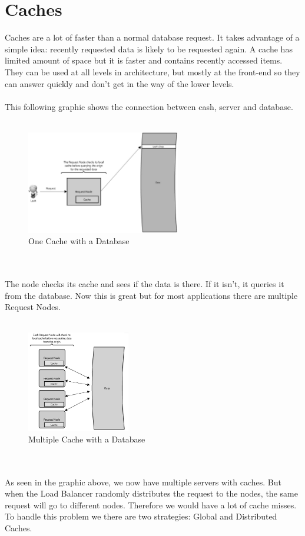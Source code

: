 \documentclass[12p]{article}
\begin{document}
	\newpage
	\section{Caches}
	
	Caches are a lot of faster than a normal database request. It takes advantage of a simple idea: recently requested data is likely to be requested again. A cache has limited amount of space but it is faster and contains recently accessed items. They can be used at all levels in architecture, but mostly at the front-end so they can answer quickly and don't get in the way of the lower levels. \\\\
	This following graphic shows the connection between cash, server and database. \\\\
	\begin{figure}[h!]
		\centering
		\includegraphics[width=0.6\textwidth]{img/cache1}
		\caption{One Cache with a Database \cite{cache}}
	\end{figure}
	\\\\
	The node checks its cache and sees if the data is there. If it isn't, it queries it from the database. Now this is great but for most applications there are multiple Request Nodes. \\\\
	\begin{figure}[h!]
		\centering
		\includegraphics[width=0.4\textwidth]{img/cache2}
		\caption{Multiple Cache with a Database \cite{cache}}
	\end{figure}
	\\\\
	As seen in the graphic above, we now have multiple servers with caches. But when the Load Balancer randomly distributes the request to the nodes, the same request will go to different nodes. Therefore we would have a lot of cache misses. To handle this problem we there are two strategies: Global and Distributed Caches. 
	
\end{document}
